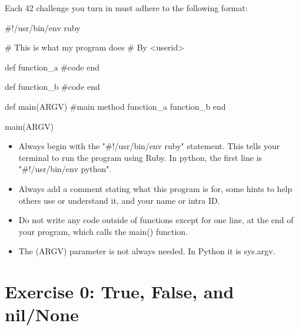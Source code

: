 \documentclass{42-en}
\begin{document}
Each 42 challenge you turn in must adhere to the following format:

\begin{42rbcode}
#!/usr/bin/env ruby

# This is what my program does
# By <userid>

def function_a
 #code
end

def function_b
 #code
end

def main(ARGV)
 #main method
 function_a
 function_b
end

main(ARGV)
\end{42rbcode}

\begin{itemize}
	\item Always begin with the "\#!/usr/bin/env ruby" statement. This tells your terminal to run the program using Ruby. In python, the first line is "\#!/usr/bin/env python".
	\item Always add a comment stating what this program is for, some hints to help others use or understand it, and your name or intra ID.
	\item Do not write any code outside of functions except for one line, at the end of your program, which calls the main() function.
	\item The (ARGV) parameter is not always needed. In Python it is sys.argv.
\end{itemize}


\startexercices



\chapter{Exercise 0: True, False, and nil/None}

\makeheaderfiles
\end{document}
